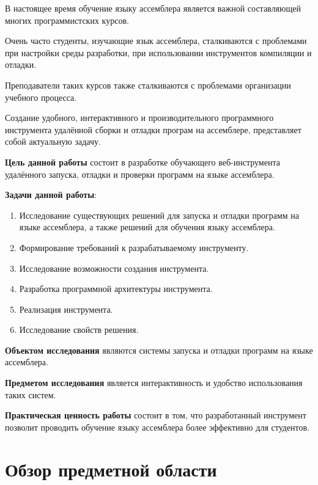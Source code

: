 \documentclass[a4paper,article,14pt]{extarticle}
\begin{document}
%

\tableofcontents
\pagebreak


В настоящее время обучение языку ассемблера является важной составляющей многих программистских курсов.

Очень часто студенты, изучающие язык ассемблера, сталкиваются с проблемами при настройки среды разработки, при использовании инструментов компиляции и отладки.

Преподаватели таких курсов также сталкиваются с проблемами организации учебного процесса.

Создание удобного, интерактивного и производительного программного инструмента удалённой сборки и отладки програм на ассемблере, представляет собой актуальную задачу.


\textbf{Цель данной работы} состоит в разработке обучающего веб-инструмента удалённого запуска, отладки и проверки программ на языке ассемблера.

\textbf{Задачи данной работы}:

\begin{enumerate}
    \item Исследование существующих решений для запуска и отладки программ на языке ассемблера, а также решений для обучения языку ассемблера.
    \item Формирование требований к разрабатываемому инструменту.
    \item Исследование возможности создания инструмента.
    \item Разработка программной архитектуры инструмента.
    \item Реализация инструмента.
    \item Исследование свойств решения.
\end{enumerate}

\textbf{Объектом исследования} являются системы запуска и отладки программ на языке ассемблера.

\textbf{Предметом исследования} является интерактивность и удобство использования таких систем.

\textbf{Практическая ценность работы} состоит в том, что разработанный инструмент позволит проводить обучение языку ассемблера более эффективно для студентов.

\section{Обзор предметной области}
\end{document}
